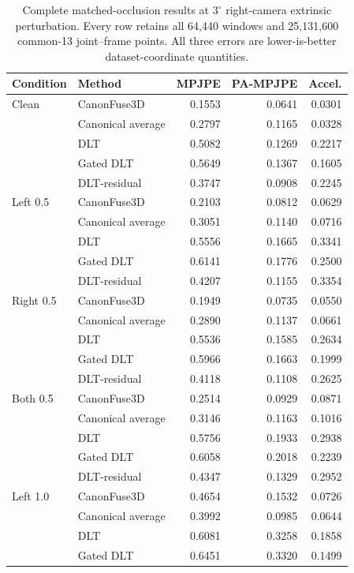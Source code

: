 \begin{table}[htbp]
\centering
\caption{Complete matched-occlusion results at $3^\circ$ right-camera extrinsic perturbation. Every row retains all 64,440 windows and 25,131,600 common-13 joint--frame points. All three errors are lower-is-better dataset-coordinate quantities.}
\label{tab:c07_full_3}
\small
\setlength{\tabcolsep}{4pt}
\begin{tabular}{llrrr}
\toprule
Condition & Method & MPJPE & PA-MPJPE & Accel. \\
\midrule
Clean & CanonFuse3D & 0.1553 & 0.0641 & 0.0301 \\
 & Canonical average & 0.2797 & 0.1165 & 0.0328 \\
 & DLT & 0.5082 & 0.1269 & 0.2217 \\
 & Gated DLT & 0.5649 & 0.1367 & 0.1605 \\
 & DLT-residual & 0.3747 & 0.0908 & 0.2245 \\
Left 0.5 & CanonFuse3D & 0.2103 & 0.0812 & 0.0629 \\
 & Canonical average & 0.3051 & 0.1140 & 0.0716 \\
 & DLT & 0.5556 & 0.1665 & 0.3341 \\
 & Gated DLT & 0.6141 & 0.1776 & 0.2500 \\
 & DLT-residual & 0.4207 & 0.1155 & 0.3354 \\
Right 0.5 & CanonFuse3D & 0.1949 & 0.0735 & 0.0550 \\
 & Canonical average & 0.2890 & 0.1137 & 0.0661 \\
 & DLT & 0.5536 & 0.1585 & 0.2634 \\
 & Gated DLT & 0.5966 & 0.1663 & 0.1999 \\
 & DLT-residual & 0.4118 & 0.1108 & 0.2625 \\
Both 0.5 & CanonFuse3D & 0.2514 & 0.0929 & 0.0871 \\
 & Canonical average & 0.3146 & 0.1163 & 0.1016 \\
 & DLT & 0.5756 & 0.1933 & 0.2938 \\
 & Gated DLT & 0.6058 & 0.2018 & 0.2239 \\
 & DLT-residual & 0.4347 & 0.1329 & 0.2952 \\
Left 1.0 & CanonFuse3D & 0.4654 & 0.1532 & 0.0726 \\
 & Canonical average & 0.3992 & 0.0985 & 0.0644 \\
 & DLT & 0.6081 & 0.3258 & 0.1858 \\
 & Gated DLT & 0.6451 & 0.3320 & 0.1499 \\

\end{tabular}
\end{table}
